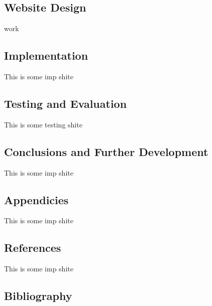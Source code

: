 \documentclass[12pt]{article}
\begin{document}
\begin{center}
\subsection{Website Design}
work
\end{center}

\begin{center}
\section{Implementation}
This is some imp shite
\end{center}

\begin{center}
\section{Testing and Evaluation}
This is some testing shite
\end{center}

\begin{center}
\section{Conclusions and Further Development}
This is some imp shite
\end{center}

\begin{center}
\section{Appendicies}
This is some imp shite
\end{center}

\begin{center}
\section{References}
This is some imp shite
\end{center}

\begin{center}
\section{Bibliography}
\end{center}

\end{document}
